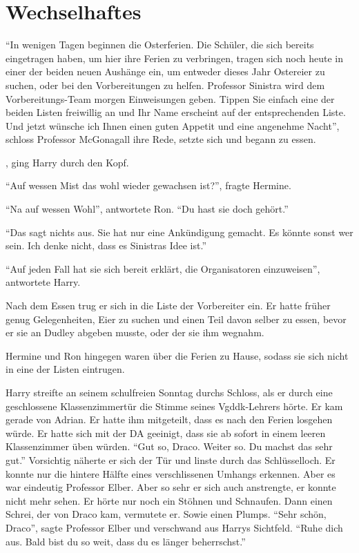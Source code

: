\chapter{Wechselhaftes}


\enquote{In wenigen Tagen beginnen die Osterferien. Die Schüler, die sich bereits eingetragen haben, um hier ihre Ferien zu verbringen, tragen sich noch heute in einer der beiden neuen Aushänge ein, um entweder dieses Jahr Ostereier zu suchen, oder bei den Vorbereitungen zu helfen. Professor Sinistra wird dem Vorbereitungs-Team morgen Einweisungen geben. Tippen Sie einfach eine der beiden Listen freiwillig an und Ihr Name erscheint auf der entsprechenden Liste. Und jetzt wünsche ich Ihnen einen guten Appetit und eine angenehme Nacht}, schloss Professor McGonagall ihre Rede, setzte sich und begann zu essen.

, ging Harry durch den Kopf. 

\enquote{Auf wessen Mist das wohl wieder gewachsen ist?}, fragte Hermine.

\enquote{Na auf wessen Wohl}, antwortete Ron. \enquote{Du hast sie doch gehört.}

\enquote{Das sagt nichts aus. Sie hat nur eine Ankündigung gemacht. Es könnte sonst wer sein. Ich denke nicht, dass es Sinistras Idee ist.}

\enquote{Auf jeden Fall hat sie sich bereit erklärt, die Organisatoren einzuweisen}, antwortete Harry.

Nach dem Essen trug er sich in die Liste der Vorbereiter ein. Er hatte früher genug Gelegenheiten, Eier zu suchen und einen Teil davon selber zu essen, bevor er sie an Dudley abgeben musste, oder der sie ihm wegnahm.

Hermine und Ron hingegen waren über die Ferien zu Hause, sodass sie sich nicht in eine der Listen eintrugen.

Harry streifte an seinem schulfreien Sonntag durchs Schloss, als er durch eine geschlossene Klassenzimmertür die Stimme seines Vgddk-Lehrers hörte. Er kam gerade von Adrian. Er hatte ihm mitgeteilt, dass es nach den Ferien losgehen würde. Er hatte sich mit der DA geeinigt, dass sie ab sofort in einem leeren Klassenzimmer üben würden. \enquote{Gut so, Draco. Weiter so. Du machst das sehr gut.} Vorsichtig näherte er sich der Tür und linste durch das Schlüsselloch. Er konnte nur die hintere Hälfte eines verschlissenen Umhangs erkennen. Aber es war eindeutig Professor Elber. Aber so sehr er sich auch anstrengte, er konnte nicht mehr sehen. Er hörte nur noch ein Stöhnen und Schnaufen. Dann einen Schrei, der von Draco kam, vermutete er. Sowie einen Plumps. \enquote{Sehr schön, Draco}, sagte Professor Elber und verschwand aus Harrys Sichtfeld. \enquote{Ruhe dich aus. Bald bist du so weit, dass du es länger beherrschst.}

